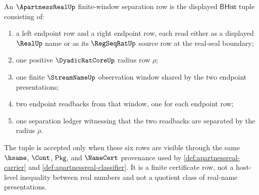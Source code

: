 \begin{definition}
\label{def:apartnessreal-finite-window-separation-row}
An $\ApartnessRealUp$ finite-window separation row is the displayed $\mathsf{BHist}$ tuple consisting of:
\begin{enumerate}
\item a left endpoint row and a right endpoint row, each read either as a displayed $\RealUp$ name or as its $\RegSeqRatUp$ source row at the real-seal boundary;
\item one positive $\DyadicRatCoreUp$ radius row $\rho$;
\item one finite $\StreamNameUp$ observation window shared by the two endpoint presentations;
\item two endpoint readbacks from that window, one for each endpoint row;
\item one separation ledger witnessing that the two readbacks are separated by the radius $\rho$.
\end{enumerate}
The tuple is accepted only when these six rows are visible through the same $\hsame$, $\Cont$, $\mathsf{Pkg}$, and $\NameCert$ provenance used by \autoref{def:apartnessreal-carrier} and \autoref{def:apartnessreal-classifier}. It is a finite certificate row, not a host-level inequality between real numbers and not a quotient class of real-name presentations.
\end{definition}

